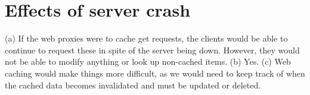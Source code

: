 \section{Effects of server crash}
(a) If the web proxies were to cache get requests, the clients would be able to continue to request these in spite of the server being down. However, they would not be able to modify anything or look up non-cached items. (b) Yes. (c) Web caching would make things more difficult, as we would need to keep track of when the cached data becomes invalidated and must be updated or deleted.

